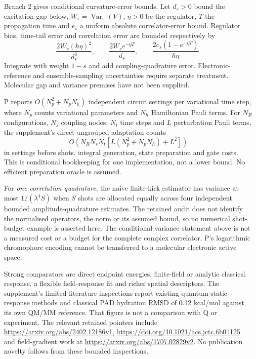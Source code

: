 \documentclass{article}
\begin{document}
Branch 2 gives conditional curvature-error bounds. Let $d_s>0$ bound the excitation gap below, $W_s=\operatorname{Var}_s(V)$, $\eta>0$ be the regulator, $T$ the propagation time and $e_s$ a uniform absolute correlator-error bound. Regulator bias, time-tail error and correlation error are bounded respectively by
\begin{equation*}
\frac{2W_s(\hbar\eta)^2}{d_s^3},\qquad
\frac{2W_s e^{-\eta T}}{d_s},\qquad
\frac{2e_s(1-e^{-\eta T})}{\hbar\eta}.
\end{equation*}
Integrate with weight $1-s$ and add coupling-quadrature error. Electronic-reference and ensemble-sampling uncertainties require separate treatment. Molecular gap and variance premises have not been supplied.

P reports $O(N_p^2+N_pN_h)$ independent circuit settings per variational time step, where $N_p$ counts variational parameters and $N_h$ Hamiltonian Pauli terms. For $N_R$ configurations, $N_s$ coupling nodes, $N_t$ time steps and $L$ perturbation Pauli terms, the supplement's direct ungrouped adaptation counts
\begin{equation*}
O\left(N_RN_sN_t\left[L(N_p^2+N_pN_h)+L^2\right]\right)
\end{equation*}
in settings before shots, integral generation, state preparation and gate costs. This is conditional bookkeeping for one implementation, not a lower bound. No efficient preparation oracle is assumed.

For \emph{one correlation quadrature}, the naive finite-kick estimator has variance at most $1/(\lambda^4S)$ when $S$ shots are allocated equally across four independent bounded amplitude-quadrature estimates. The retained audit does not identify the normalised operators, the norm or its assumed bound, so no numerical shot-budget example is asserted here. The conditional variance statement above is not a measured cost or a budget for the complete complex correlator. P's logarithmic chromophore encoding cannot be transferred to a molecular electronic active space.

Strong comparators are direct endpoint energies, finite-field or analytic classical response, a flexible field-response fit and richer spatial descriptors. The supplement's limited literature inspections report existing quantum static-response methods and classical PAD hydration RMSD of 0.12 kcal/mol against its own QM/MM reference. That figure is not a comparison with Q or experiment. The relevant retained pointers include \url{https://arxiv.org/abs/2402.12186v1}, \url{https://doi.org/10.1021/acs.jctc.6b01125} and field-gradient work at \url{https://arxiv.org/abs/1707.02829v2}. No publication novelty follows from these bounded inspections.
\end{document}

